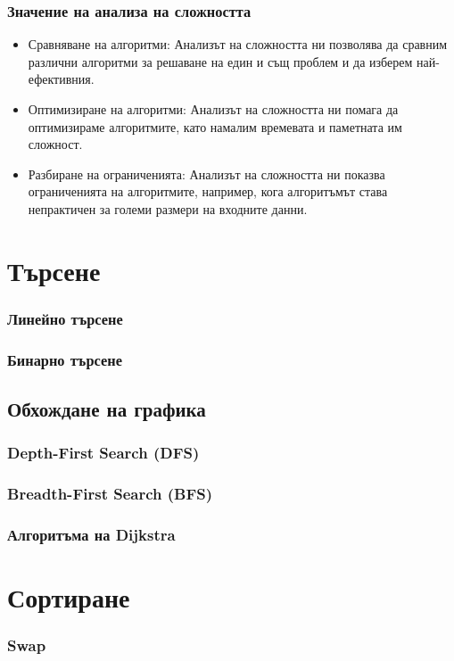 \documentclass[oneside]{book}
\begin{document}
\subsubsection{Значение на анализа на сложността}
\begin{itemize}
    \item Сравняване на алгоритми: Анализът на сложността ни позволява да сравним различни алгоритми за решаване на един и същ проблем и да изберем най-ефективния.
    \item Оптимизиране на алгоритми: Анализът на сложността ни помага да оптимизираме алгоритмите, като намалим времевата и паметната им сложност.
    \item Разбиране на ограниченията: Анализът на сложността ни показва ограниченията на алгоритмите, например, кога алгоритъмът става непрактичен за големи размери на входните данни.
\end{itemize}

\section{Търсене}
\subsubsection{Линейно търсене}
\subsubsection{Бинарно търсене}

\subsection{Обхождане на графика}
\subsubsection{Depth-First Search (DFS)}
\subsubsection{Breadth-First Search (BFS)}
\subsubsection{Алгоритъма на Dijkstra}

\section{Сортиране}
\subsubsection{Swap}
\end{document}
